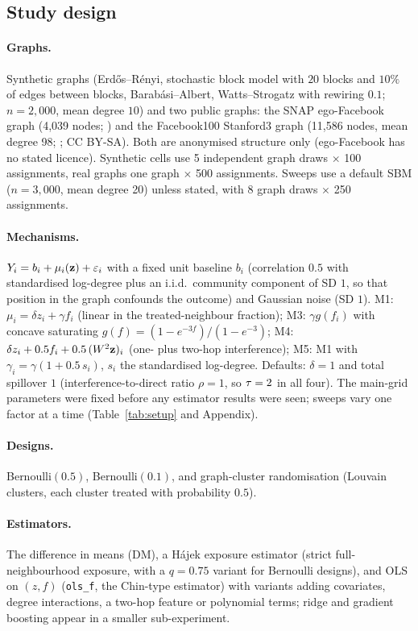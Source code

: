 \subsection{Study design}
\label{sec:design}
\paragraph{Graphs.} Synthetic graphs (Erd\H{o}s--R\'enyi, stochastic block model with $20$ blocks and $10\%$ of edges between blocks, Barab\'asi--Albert, Watts--Strogatz with rewiring $0.1$; $n=2{,}000$, mean degree $10$) and two public graphs: the SNAP ego-Facebook graph (4,039 nodes; \citealt{mcauley2012learning}) and the Facebook100 Stanford3 graph (11,586 nodes, mean degree 98; \citealt{traud2012social,rossi2015network}; CC BY-SA). Both are anonymised structure only (ego-Facebook has no stated licence). Synthetic cells use 5 independent graph draws $\times$ 100 assignments, real graphs one graph $\times$ 500 assignments. Sweeps use a default SBM ($n=3{,}000$, mean degree 20) unless stated, with 8 graph draws $\times$ 250 assignments.
\paragraph{Mechanisms.} $Y_i=b_i+\mu_i(\mathbf{z})+\varepsilon_i$ with a fixed unit baseline $b_i$ (correlation $0.5$ with standardised log-degree plus an i.i.d.\ community component of SD $1$, so that position in the graph confounds the outcome) and Gaussian noise (SD $1$). M1: $\mu_i=\delta z_i+\gamma f_i$ (linear in the treated-neighbour fraction); M3: $\gamma g(f_i)$ with concave saturating $g(f)=(1-e^{-3f})/(1-e^{-3})$; M4: $\delta z_i+0.5f_i+0.5\,(W^2\mathbf{z})_i$ (one- plus two-hop interference); M5: M1 with $\gamma_i=\gamma(1+0.5\,s_i)$, $s_i$ the standardised log-degree. Defaults: $\delta=1$ and total spillover $1$ (interference-to-direct ratio $\rho=1$, so $\tau=2$ in all four). The main-grid parameters were fixed before any estimator results were seen; sweeps vary one factor at a time (Table~\ref{tab:setup} and Appendix).
\paragraph{Designs.} Bernoulli$(0.5)$, Bernoulli$(0.1)$, and graph-cluster randomisation (Louvain clusters, each cluster treated with probability $0.5$).
\paragraph{Estimators.} The difference in means (DM), a H\'ajek exposure estimator (strict full-neighbourhood exposure, with a $q=0.75$ variant for Bernoulli designs), and OLS on $(z,f)$ (\texttt{ols\_f}, the Chin-type estimator) with variants adding covariates, degree interactions, a two-hop feature or polynomial terms; ridge and gradient boosting appear in a smaller sub-experiment.
